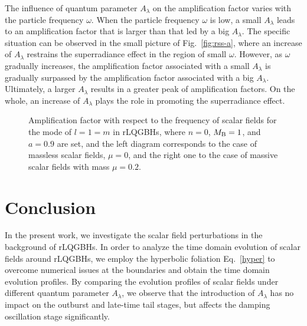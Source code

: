 \documentclass[12pt]{article}
\begin{document}
The influence of quantum parameter $A_\lambda$ on the amplification factor varies with the particle frequency $\omega$. 
When the particle frequency $\omega$ is low, a small $A_\lambda$ leads to an amplification factor that is larger than that led by a big $A_\lambda$.
The specific situation can be observed in the small picture of  Fig.~\ref{fig:rss-a}, where 
an increase of $A_\lambda$ restrains the superradiance effect in the region of small $\omega$. 
However, as $\omega$ gradually increases, the amplification factor associated with a small $A_\lambda$ is gradually surpassed by the amplification factor associated with a big $A_\lambda$. 
Ultimately, a larger $A_\lambda$ results in a greater peak of amplification factors.
On the whole, an increase of $A_\lambda$ plays the role in promoting the superradiance effect.

\begin{figure}[htbp]
   	\centering
\caption{Amplification factor with respect to the frequency of scalar fields for the mode of $l=1=m$ in rLQGBHs,   where $n=0$, $M_{\rm B}=1$, and $a=0.9$ are set, and the left diagram corresponds to the case of massless scalar fields, $\mu=0$, and the right one to the case of massive scalar fields with mass $\mu=0.2$.}
\label{fig:rLQGBH_shooting_superradiance}
\end{figure}


\section{Conclusion}\label{sec:con}
In the present work, we investigate the scalar field perturbations in the background of rLQGBHs. 
In order to analyze the time domain evolution of scalar fields around rLQGBHs, we employ the hyperbolic foliation Eq.~\eqref{hyper} to overcome numerical issues at the boundaries and obtain the time domain evolution profiles. By comparing the evolution profiles of scalar fields under different quantum parameter $A_\lambda$, we observe that the introduction of $A_\lambda$ has no impact on the outburst and late-time tail stages, but affects the damping oscillation stage significantly.
\end{document}
